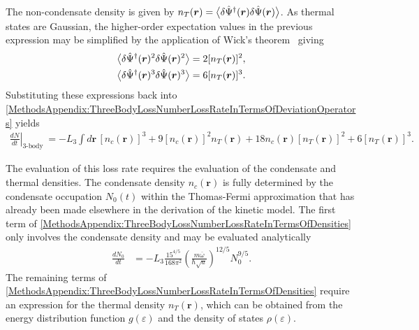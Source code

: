 The non-condensate density is given by $n_T(\bm{r}) = {\big<\delta\hat{\Psi}^\dagger(\bm{r}) \delta\hat{\Psi}(\bm{r})\big>}$.  As thermal states are Gaussian, the higher-order expectation values in the previous expression may be simplified by the application of Wick's theorem~\citep{Wick:1950} giving
\begin{align}
    {\ensuremath{\big<\delta\hat{\Psi}^\dagger(\bm{r})^2 \delta\hat{\Psi}(\bm{r})^2\big>}} &= 2 [n_T(\bm{r})]^2, \\
    {\big<\delta\hat{\Psi}^\dagger(\bm{r})^3 \delta\hat{\Psi}(\bm{r})^3\big>} &= 6 [n_T(\bm{r})]^3.
\end{align}
Substituting these expressions back into \eqref{MethodsAppendix:ThreeBodyLossNumberLossRateInTermsOfDeviationOperators} yields
\begin{align}
    \left.\frac{d N}{dt} \right|_\text{3-body loss} &=  -L_3 \int d \bm{r}\, [n_c(\bm{r})]^3 + 9 [n_c(\bm{r})]^2 n_T(\bm{r}) + 18 n_c(\bm{r}) [n_T(\bm{r})]^2 + 6 [n_T(\bm{r})]^3.
    \label{MethodsAppendix:ThreeBodyLossNumberLossRateInTermsOfDensities}
\end{align}

The evaluation of this loss rate requires the evaluation of the condensate and thermal densities.  The condensate density $n_c(\bm{r})$ is fully determined by the condensate occupation $N_0(t)$ within the Thomas-Fermi approximation that has already been made elsewhere in the derivation of the kinetic model.  The first term of \eqref{MethodsAppendix:ThreeBodyLossNumberLossRateInTermsOfDensities} only involves the condensate density and may be evaluated analytically
\begin{align}
    \frac{d N_0}{dt} &= - L_3 \frac{15^{4/5}}{168 \pi^2} \left(\frac{m \overline{\omega}}{\hbar \sqrt{a}} \right)^{12/5} N_0^{9/5}.
\end{align}
The remaining terms of \eqref{MethodsAppendix:ThreeBodyLossNumberLossRateInTermsOfDensities} require an expression for the thermal density $n_T(\bm{r})$, which can be obtained from the energy distribution function $g(\varepsilon)$ and the density of states $\rho(\varepsilon)$.

